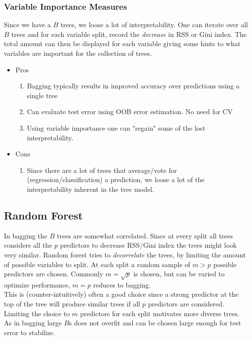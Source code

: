 \documentclass{article}
\begin{document}
\subsubsection{Variable Importance Measures}
Since we have a $B$ trees, we loose a lot of interpretability. One can iterate over all $B$ trees and for each variable split, record the \textit{decrease} in RSS or Gini index. The total amount can then be displayed for each variable giving some hints to what variables are important for the collection of trees.

\begin{itemize}
    \item Pros
    \begin{enumerate}
        \item Bagging typically results in improved accuracy over predictions using a single tree \item Can evaluate test error using OOB error estimation. No need for CV  
        \item Using variable importance one can "regain" some of the lost interpretability. 
    \end{enumerate}
    \item Cons
    \begin{enumerate}
        \item Since there are a lot of trees that average/vote for (regression/classification) a prediction, we loose a lot of the interpretability inherent in the tree model.  
    \end{enumerate}
\end{itemize}

\subsection{Random Forest}
In bagging the $B$ trees are somewhat correlated. Since at every split all trees considers all the $p$ predictors to decrease RSS/Gini index the trees might look very similar. Random forest tries to \textit{decorrelate} the trees, by limiting the amount of possible variables to split. At each split a random sample of $m > p$ possible predictors are chosen. Commonly $m = \sqrt{p}$ is chosen, but can be varied to optimize performance, $m = p$ reduces to bagging. 
\\
This is (counter-intuitively) often a good choice since a strong predictor at the top of the tree will produce similar trees if all $p$ predictors are considered. Limiting the choice to $m$ predictors for each split motivates more diverse trees. As in bagging large $B$s does not overfit and can be chosen large enough for test error to stabilize.   
\end{document}
